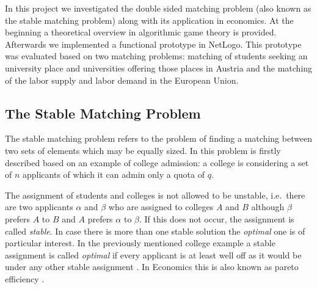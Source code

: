 In this project we investigated the double sided matching problem (also known as the stable matching problem) along with its application in economics. At the beginning a theoretical overview in algorithmic game theory is provided. Afterwards we implemented a functional prototype in NetLogo\cite{netlogo}. This prototype was evaluated based on two matching problems: matching of students seeking an university place and universities offering those places in Austria and the matching of the labor supply and labor demand in the European Union.

\subsection{The Stable Matching Problem}
The stable matching problem refers to the problem of finding a matching between two sets of elements which may be equally sized. In \cite{gale62a} this problem is firstly described based on an example of college admission: a college is considering a set of $n$ applicants of which it can admin only a quota of $q$.

The assignment of students and colleges is not allowed to be unstable, i.e.\ there are two applicants $\alpha$ and $\beta$ who are assigned to colleges $A$ and $B$ although $\beta$ prefers $A$ to $B$ and $A$ prefers $\alpha$ to $\beta$. If this does not occur, the assignment is called \textit{stable}. In case there is more than one stable solution the \textit{optimal} one is of particular interest. In the previously mentioned college example a stable assignment is called \textit{optimal} if every applicant is at least well off as it would be under any other stable assignment \cite{gale62a}. In Economics this is also known as pareto efficiency \cite[p. 46]{9780199297818}.


